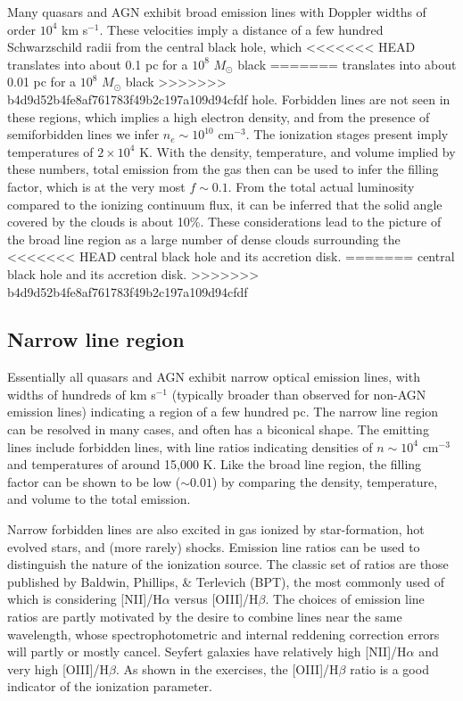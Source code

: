 Many quasars and AGN exhibit broad emission lines with Doppler widths
of order $10^4$ km s$^{-1}$. These velocities imply a distance of a
few hundred Schwarzschild radii from the central black hole, which
<<<<<<< HEAD
translates into about 0.1 pc for a $10^8$ $M_\odot$ black
=======
translates into about 0.01 pc for a $10^8$ $M_\odot$ black
>>>>>>> b4d9d52b4fe8af761783f49b2c197a109d94cfdf
hole. Forbidden lines are not seen in these regions, which implies a
high electron density, and from the presence of semiforbidden lines we
infer $n_e \sim 10^{10}$ cm$^{-3}$. The ionization stages present
imply temperatures of $2\times 10^4$ K. With the density, temperature,
and volume implied by these numbers, total emission from the gas then
can be used to infer the filling factor, which is at the very most
$f\sim 0.1$. From the total actual luminosity compared to the ionizing
continuum flux, it can be inferred that the solid angle covered by the
clouds is about 10\%. These considerations lead to the picture of the
broad line region as a large number of dense clouds surrounding the
<<<<<<< HEAD
central black hole and its accretion disk.
=======
central black hole and its accretion disk. 
>>>>>>> b4d9d52b4fe8af761783f49b2c197a109d94cfdf

\subsection{Narrow line region}

Essentially all quasars and AGN exhibit narrow optical emission lines,
with widths of hundreds of km s$^{-1}$ (typically broader than
observed for non-AGN emission lines) indicating a region of a few
hundred pc. The narrow line region can be resolved in many cases, and
often has a biconical shape. The emitting lines include forbidden
lines, with line ratios indicating densities of $n\sim 10^4$ cm$^{-3}$
and temperatures of around 15,000 K. Like the broad line region, the
filling factor can be shown to be low ($\sim 0.01$) by comparing the
density, temperature, and volume to the total emission.

Narrow forbidden lines are also excited in gas ionized by
star-formation, hot evolved stars, and (more rarely) shocks. Emission
line ratios can be used to distinguish the nature of the ionization
source. The classic set of ratios are those published by Baldwin,
Phillips, \& Terlevich (BPT), the most commonly used of which is
considering [NII]/H$\alpha$ versus [OIII]/H$\beta$. The choices of
emission line ratios are partly motivated by the desire to combine
lines near the same wavelength, whose spectrophotometric and internal
reddening correction errors will partly or mostly cancel. Seyfert
galaxies have relatively high [NII]/H$\alpha$ and very high
[OIII]/H$\beta$. As shown in the exercises, the [OIII]/H$\beta$ ratio
is a good indicator of the ionization parameter.

